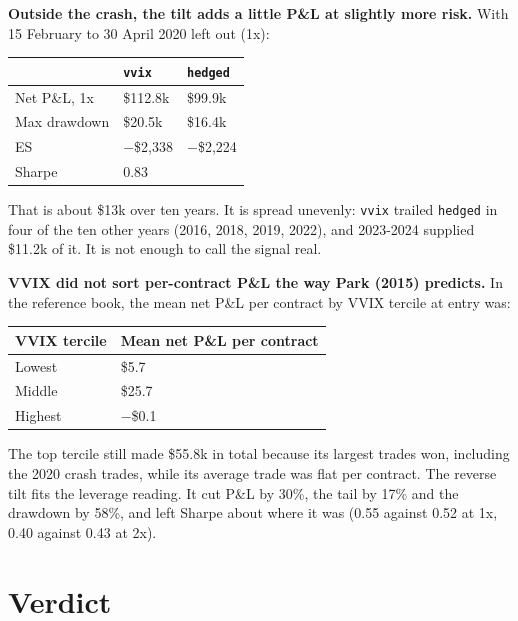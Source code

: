 \documentclass{article}
\begin{document}
\textbf{Outside the crash, the tilt adds a little P\&L at slightly more risk.} With 15 February to 30 April 2020 left out (1x):

\begin{center}\small
\begin{tabularx}{\linewidth}{l l >{\raggedright\arraybackslash}X}
\toprule
\textbf{} & \textbf{\texttt{vvix}} & \textbf{\texttt{hedged}} \\
\midrule
Net P\&L, 1x & \$112.8k & \$99.9k \\
Max drawdown & \$20.5k & \$16.4k \\
ES & \ensuremath{-}\$2,338 & \ensuremath{-}\$2,224 \\
Sharpe & 0.83 & 0.81 \\
\bottomrule
\end{tabularx}
\end{center}

That is about \$13k over ten years. It is spread unevenly: \texttt{vvix} trailed \texttt{hedged} in four of the ten other years (2016, 2018, 2019, 2022), and 2023-2024 supplied \$11.2k of it. It is not enough to call the signal real.

\textbf{VVIX did not sort per-contract P\&L the way Park (2015) predicts.} In the reference book, the mean net P\&L per contract by VVIX tercile at entry was:

\begin{center}\small
\begin{tabularx}{\linewidth}{l >{\raggedright\arraybackslash}X}
\toprule
\textbf{VVIX tercile} & \textbf{Mean net P\&L per contract} \\
\midrule
Lowest & \$5.7 \\
Middle & \$25.7 \\
Highest & \ensuremath{-}\$0.1 \\
\bottomrule
\end{tabularx}
\end{center}

The top tercile still made \$55.8k in total because its largest trades won, including the 2020 crash trades, while its average trade was flat per contract. The reverse tilt fits the leverage reading. It cut P\&L by 30\%, the tail by 17\% and the drawdown by 58\%, and left Sharpe about where it was (0.55 against 0.52 at 1x, 0.40 against 0.43 at 2x).

\section{Verdict}
\end{document}
